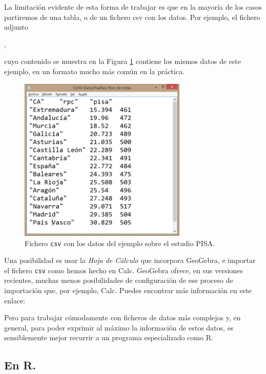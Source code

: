\documentclass[10pt,a4paper]{article}\usepackage[]{graphicx}\usepackage[]{color}
\newcounter {cont01}
\begin{document}
La limitación evidente de esta forma de trabajar es que en la mayoría de los casos partiremos de una tabla, o de un fichero csv con los datos. Por ejemplo, el fichero adjunto
\begin{center}
,
\end{center}
cuyo contenido se muestra en la Figura \ref{tut10:fig:FicheroCsvPisaPais} contiene los mismos datos de este ejemplo, en un formato mucho más común en la práctica.
\begin{figure}[h!]
\begin{center}
    \includegraphics[width=8cm]{../fig/Tut10-01.png}
\end{center}
\caption{Fichero {\tt csv} con los datos del ejemplo sobre el estudio PISA.}
\label{tut10:fig:FicheroCsvPisaPais}
\end{figure}
Una posibilidad es usar la {\em Hoja de Cálculo} que incorpora GeoGebra, e importar el fichero {\tt csv} como hemos hecho en Calc. GeoGebra ofrece, en sus versiones recientes, muchas menos posibilidades de configuración de ese proceso de importación que, por ejemplo, Calc. Puedes encontrar más información en este enlace:
\begin{center}
\end{center}
Pero para trabajar cómodamente con ficheros de datos más complejos y, en general, para poder exprimir al máximo la información de estos datos,  es sensiblemente mejor recurrir a un programa especializado como R.

\subsection{En R.}
\label{tut10:subsec:DiagramaDispersionEnR}
\end{document}
